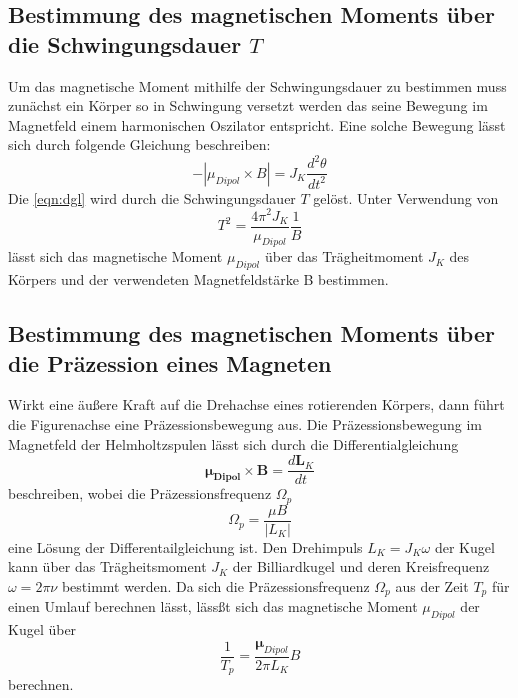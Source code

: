 \documentclass[
  bibliography=totoc,     %
  captions=tableheading,  %
  titlepage=firstiscover, %
]{scrartcl}
\begin{document}
  \subsection{Bestimmung des magnetischen Moments über die Schwingungsdauer $T$}
  Um das magnetische Moment mithilfe der Schwingungsdauer zu bestimmen muss zunächst ein Körper so in Schwingung versetzt werden das seine Bewegung im 
  Magnetfeld einem harmonischen Oszilator entspricht. Eine solche Bewegung lässt sich durch folgende Gleichung beschreiben:
  \begin{equation}
  -|\mu_{Dipol}\times B|=J_K\frac{d^2\theta}{dt^2}
  \label{eqn:dgl}
  \end{equation}
  Die \autoref{eqn:dgl} wird durch die Schwingungsdauer $T$ gelöst. Unter Verwendung von
  \begin{equation}
  T^2=\frac{4\pi^2 J_K}{\mu_{Dipol}}\frac{1}{B}
  \label{eqn:auswertung2}
  \end{equation}
  lässt sich das magnetische Moment $\mu_{Dipol}$ über das Trägheitmoment $J_K$ des Körpers und der verwendeten Magnetfeldstärke B bestimmen.
  
  \subsection{Bestimmung des magnetischen Moments über die Präzession eines Magneten}
  \label{sec:Präzession}
  Wirkt eine äußere Kraft auf die Drehachse eines rotierenden Körpers, dann führt die Figurenachse eine Präzessionsbewegung aus.
  Die Präzessionsbewegung im Magnetfeld der Helmholtzspulen lässt sich durch die Differentialgleichung
  \begin{equation}
      \symbf{\mu_{Dipol}} \times \symbf{B} = \frac{d\symbf{L}_K}{dt}
  \end{equation}
  beschreiben, wobei die Präzessionsfrequenz $\Omega_p$
  \begin{equation}
      \Omega_p = \frac{\mu B}{|L_K|}
  \end{equation}
  eine Lösung der Differentailgleichung ist.
  Den Drehimpuls $L_K = J_K \omega$ der Kugel kann über das Trägheitsmoment $J_K$ der Billiardkugel und deren Kreisfrequenz $\omega = 2\pi \nu$ bestimmt werden.
  Da sich die Präzessionsfrequenz $\Omega_p$ aus der Zeit $T_p$ für einen Umlauf berechnen lässt, lässßt sich das magnetische Moment $\mu_{Dipol}$ der Kugel über
  \begin{equation}
      \frac{1}{T_p} = \frac{\symbf{\mu}_{Dipol}}{2 \pi L_K} B
      \label{eqn:praezession}
  \end{equation}
  berechnen.\\
\end{document}
